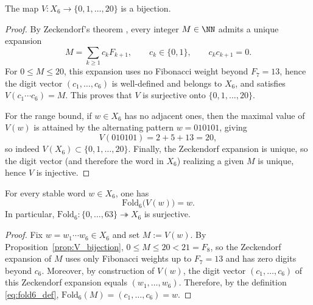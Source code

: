 \begin{proposition}\label{prop:V_bijection}
The map $V:X_6\to\{0,1,\dots,20\}$ is a bijection.
\end{proposition}
\begin{proof}
By Zeckendorf's theorem \cite{Zeckendorf1972}, every integer $M\in\NN$ admits a unique expansion
\[
M=\sum_{k\ge 1} c_k F_{k+1},\qquad c_k\in\{0,1\},\qquad c_kc_{k+1}=0.
\]
For $0\le M\le 20$, this expansion uses no Fibonacci weight beyond $F_7=13$, hence the digit vector $(c_1,\dots,c_6)$ is well-defined and belongs to $X_6$, and satisfies $V(c_1\cdots c_6)=M$.
This proves that $V$ is surjective onto $\{0,1,\dots,20\}$.

For the range bound, if $w\in X_6$ has no adjacent ones, then the maximal value of $V(w)$ is attained by the alternating pattern $w=010101$, giving
\[
V(010101)=2+5+13=20,
\]
so indeed $V(X_6)\subset\{0,1,\dots,20\}$.
Finally, the Zeckendorf expansion is unique, so the digit vector (and therefore the word in $X_6$) realizing a given $M$ is unique, hence $V$ is injective.
\end{proof}

\begin{lemma}\label{lem:fold6_surjective}
For every stable word $w\in X_6$, one has
\[
\mathrm{Fold}_6\!\bigl(V(w)\bigr)=w.
\]
In particular, $\mathrm{Fold}_6:\{0,\dots,63\}\twoheadrightarrow X_6$ is surjective.
\end{lemma}
\begin{proof}
Fix $w=w_1\cdots w_6\in X_6$ and set $M:=V(w)$.
By Proposition~\ref{prop:V_bijection}, $0\le M\le 20<21=F_8$, so the Zeckendorf expansion of $M$ uses only Fibonacci weights up to $F_7=13$ and has zero digits beyond $c_6$.
Moreover, by construction of $V(w)$, the digit vector $(c_1,\dots,c_6)$ of this Zeckendorf expansion equals $(w_1,\dots,w_6)$.
Therefore, by the definition \eqref{eq:fold6_def}, $\mathrm{Fold}_6(M)=(c_1,\dots,c_6)=w$.
\end{proof}

